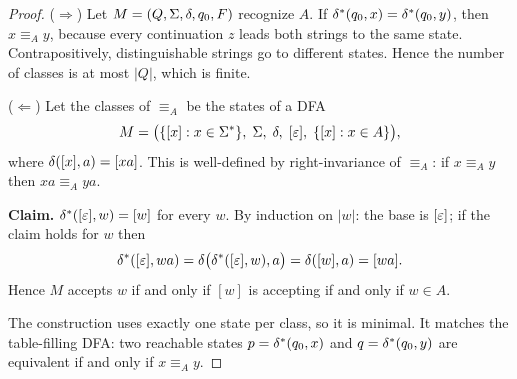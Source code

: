 \begin{proof}
($\Rightarrow$) Let $M=(Q,\Sigma,\delta,q_0,F)$ recognize $A$. If
$\delta^*(q_0,x)=\delta^*(q_0,y)$, then $x\equiv_A y$, because
every continuation $z$ leads both strings to the same state. Contrapositively,
distinguishable strings go to different states. Hence the number of classes is
at most $|Q|$, which is finite.

($\Leftarrow$) Let the classes of $\equiv_A$ be the states of a DFA
\[
  M=\bigl(\{[x]:x\in\Sigma^*\},\;
          \Sigma,\;
          \delta,\;
          [\varepsilon],\;
          \{[x]:x\in A\}\bigr),
\]
where $\delta([x],a)=[xa]$. This is well-defined by right-invariance of
$\equiv_A$: if $x\equiv_A y$ then $xa\equiv_A ya$.

\textbf{Claim.} $\delta^*([\varepsilon],w)=[w]$ for every $w$. By induction on
$|w|$: the base is $[\varepsilon]$; if the claim holds for $w$ then
\[
  \delta^*([\varepsilon],wa)
    =\delta\bigl(\delta^*([\varepsilon],w),a\bigr)
    =\delta([w],a)=[wa].
\]
Hence $M$ accepts $w$ if and only if $[w]$ is accepting if and only if
$w\in A$.

The construction uses exactly one state per class, so it is minimal. It
matches the table-filling DFA: two reachable states $p=\delta^*(q_0,x)$
and $q=\delta^*(q_0,y)$ are equivalent if and only if $x\equiv_A y$.
\end{proof}

